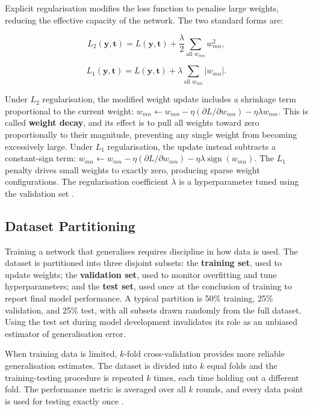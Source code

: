     Explicit regularisation modifies the loss function to penalise large weights,
    reducing the effective capacity of the network. The two standard forms are:

    \[
    L_2(\mathbf{y}, \mathbf{t}) = L(\mathbf{y}, \mathbf{t}) + \frac{\lambda}{2}
    \sum_{\text{all } w_{mn}} w_{mn}^2,
    \]

    \[
    L_1(\mathbf{y}, \mathbf{t}) = L(\mathbf{y}, \mathbf{t}) + \lambda
    \sum_{\text{all } w_{mn}} |w_{mn}|.
    \]

    Under $L_2$ regularisation, the modified weight update includes a shrinkage
    term proportional to the current weight:
    $w_{mn} \leftarrow w_{mn} - \eta(\partial L/\partial w_{mn}) - \eta\lambda w_{mn}$.
    This is called \textbf{weight decay}, and its effect is to pull all weights toward
    zero proportionally to their magnitude, preventing any single weight from
    becoming excessively large. Under $L_1$ regularisation, the update instead
    subtracts a constant-sign term:
    $w_{mn} \leftarrow w_{mn} - \eta(\partial L/\partial w_{mn}) - \eta\lambda
    \operatorname{sign}(w_{mn})$. The $L_1$ penalty drives small weights to exactly
    zero, producing sparse weight configurations. The regularisation coefficient
    $\lambda$ is a hyperparameter tuned using the validation set
    \citep{hastie2009elements}.

    \subsection*{Dataset Partitioning}

    Training a network that generalises requires discipline in how data is used.
    The dataset is partitioned into three disjoint subsets: the \textbf{training set},
    used to update weights; the \textbf{validation set}, used to monitor overfitting
    and tune hyperparameters; and the \textbf{test set}, used once at the conclusion
    of training to report final model performance. A typical partition is 50\% training,
    25\% validation, and 25\% test, with all subsets drawn randomly from the full
    dataset. Using the test set during model development invalidates its role as an
    unbiased estimator of generalisation error.

    When training data is limited, $k$-fold cross-validation provides more reliable
    generalisation estimates. The dataset is divided into $k$ equal folds and the
    training-testing procedure is repeated $k$ times, each time holding out a different
    fold. The performance metric is averaged over all $k$ rounds, and every data point
    is used for testing exactly once \citep{hastie2009elements}.

